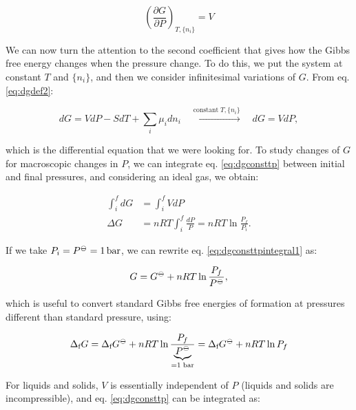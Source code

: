 \documentclass[
  9pt,
]{extbook}
\theoremstyle{definition}
\theoremstyle{definition}
\theoremstyle{definition}
\theoremstyle{remark}
\begin{document}
\[
\left(\frac{\partial G}{\partial P} \right)_{T,\{n_i\}}=V
\]

We can now turn the attention to the second coefficient that gives how the Gibbs free energy changes when the pressure change. To do this, we put the system at constant \(T\) and \(\{n_i\}\), and then we consider infinitesimal variations of \(G\). From eq. \eqref{eq:dgdef2}:

\begin{equation}
dG = VdP -SdT +\sum_i\mu_i dn_i \quad \xrightarrow{\text{constant}\; T,\{n_i\}} \quad dG = VdP,
\label{eq:dgconsttp}
\end{equation}

which is the differential equation that we were looking for. To study changes of \(G\) for macroscopic changes in \(P\), we can integrate eq. \eqref{eq:dgconsttp} between initial and final pressures, and considering an ideal gas, we obtain:

\begin{equation}
\begin{aligned}
\int_i^f dG &= \int_i^f VdP \\
\Delta G &= nRT \int_i^f \frac{dP}{P} = nRT \ln \frac{P_f}{P_i}.
\end{aligned}
\label{eq:dgconsttpintegral1}
\end{equation}

If we take \(P_i = P^{-\kern-6pt{\ominus}\kern-6pt-}= 1 \, \text{bar}\), we can rewrite eq. \eqref{eq:dgconsttpintegral1} as:

\begin{equation}
G = G^{-\kern-6pt{\ominus}\kern-6pt-}+ nRT \ln \frac{P_f}{P^{-\kern-6pt{\ominus}\kern-6pt-}},
\label{eq:dgconsttpintegral2}
\end{equation}

which is useful to convert standard Gibbs free energies of formation at pressures different than standard pressure, using:

\begin{equation}
\Delta_{\text{f}} G = \Delta_{\text{f}} G^{-\kern-6pt{\ominus}\kern-6pt-}+ nRT \ln \frac{P_f}{\underbrace{P^{-\kern-6pt{\ominus}\kern-6pt-}}_{=1 \; \text{bar}}} = \Delta_{\text{f}} G^{-\kern-6pt{\ominus}\kern-6pt-}+ nRT \ln P_f
\label{eq:dgconsttpintegral2b}
\end{equation}

For liquids and solids, \(V\) is essentially independent of \(P\) (liquids and solids are incompressible), and eq. \eqref{eq:dgconsttp} can be integrated as:
\end{document}
